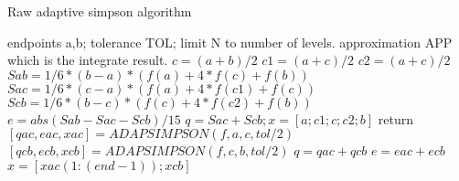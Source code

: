 \documentclass{\SetClass}
\begin{document}
\begin{algorithm}[h]
    \caption{Raw adaptive simpson algorithm}
    \begin{algorithmic}[1] %
    \Require
    endpoints a,b; tolerance TOL; limit N to number of levels.
    \Ensure
    approximation APP which is the integrate result.
  \State $c = (a+b)/2$
  \State $c1 = (a+c)/2$
  \State $c2 = (a+c)/2$
  \State $Sab = 1/6*(b-a)*(f(a)+4*f(c)+f(b))$
  \State $Sac = 1/6*(c-a)*(f(a)+4*f(c1)+f(c))$
  \State $Scb = 1/6*(b-c)*(f(c)+4*f(c2)+f(b))$
  \State $e = abs(Sab - Sac - Scb)/15$
    \State $q = Sac + Scb;x = [a;c1;c;c2;b]$
    \State return
  \Else
    \State $[qac, eac, xac] = ADAPSIMPSON(f,a,c,tol/2)$
    \State $[qcb, ecb, xcb] = ADAPSIMPSON(f,c,b,tol/2)$
    \State $q = qac + qcb$
    \State $e = eac + ecb$
    \State $x = [xac(1:(end-1)); xcb]$
  \EndIf
  \EndFunction
    \end{algorithmic}
\end{algorithm}
\end{document}
